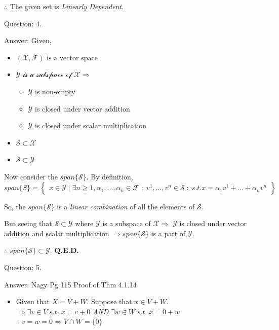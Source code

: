 \documentclass[a4paper]{article}
\begin{document}
\begin{qalist}
			$\therefore$ The given set is \textit{Linearly Dependent}.
			
		\item[Question: 4.] \setcounter{equation}{0} %
		\item[Answer:]
			Given, 
			\begin{itemize}
				\item $\mathcal{(X, F)} \text{ is a vector space}$
				\item $\mathcal{Y \text{ is a subspace of } X} \Rightarrow$
					\begin{itemize}
						\item $\mathcal{Y}$ is non-empty
						\item $\mathcal{Y}$ is closed under vector addition
						\item $\mathcal{Y}$ is closed under scalar multiplication 
					\end{itemize}
				\item $\mathcal{S \subset X}$
				\item $\mathcal{S \subset Y}$
			\end{itemize}
			
			Now consider the $span\{\mathcal{S}\}$. By definition,
			\renewcommand{\arraystretch}{1.5}
			\begin{equation}
				span\{S\} = \left\{\begin{array}{c} x \in \mathcal{Y} \;|\; \exists n \geq 1, {\alpha}_{1}, \ldots, {\alpha}_{n} \in \mathcal{F} \;;\; {v}^{1}, \ldots, {v}^{n} \in \mathcal{S}\;;\; s.t. x = {\alpha}_{1}{v}^{1} +  \ldots + {\alpha}_{n}{v}^{n}\end{array}\right\}
			\end{equation}
			
			So, the $span\{\mathcal{S}\}$ is a \textit{linear combination} of all the elements of $\mathcal{S}$. 
			
			But seeing that $\mathcal{S} \subset \mathcal{Y}$ where $\mathcal{Y}$ is a subspace of $\mathcal{X} \Rightarrow$ $\mathcal{Y}$ is closed under vector addition and scalar multiplication $\Rightarrow span\{\mathcal{S}\}$ is a part of $\mathcal{Y}$.
			
			$\therefore \; span\{\mathcal{S}\} \subset \mathcal{Y}.$ \textbf{Q.E.D.} 
		
		\item[Question: 5.] \setcounter{equation}{0}  %
		\item[Answer:] Nagy Pg 115 Proof of Thm 4.1.14
			\begin{itemize}[label=$\rightarrow$]
				\item Given that $X = V + W$. Suppose that $x \in V + W$. \\
					$\Rightarrow \exists v \in V \;s.t.\; x = v + 0$ \textit{AND} $\exists w \in W \;s.t.\; x = 0 + w$ \\
					$\therefore \; v = w = 0 \Rightarrow V \cap W = \{0\}$
				

\end{itemize}
\end{qalist}
\end{document}
